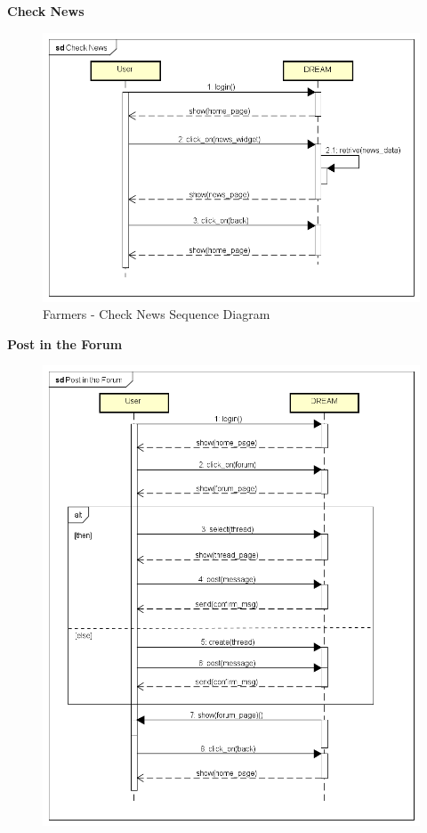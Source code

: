 \documentclass[table, 12pt]{article}
\begin{document}
\begin{itemize}
            \textbf{Check News}\\
            \begin{center}
                \begin{figure}[H]
                    \includegraphics[scale=0.60, center]{assets/Sequence diagrams/Farmer/Check News.png}
                    \caption{Farmers - Check News Sequence Diagram}
                    \label{fig: sequence_news}
                \end{figure}
            \end{center}
            \newpage
            \textbf{Post in the Forum}\\
            \begin{center}
                \begin{figure}[H]
                    \includegraphics[scale=0.60, center]{assets/Sequence diagrams/Farmer/Post in the Forum.png}

\end{figure}
\end{center}
\end{itemize}
\end{document}

